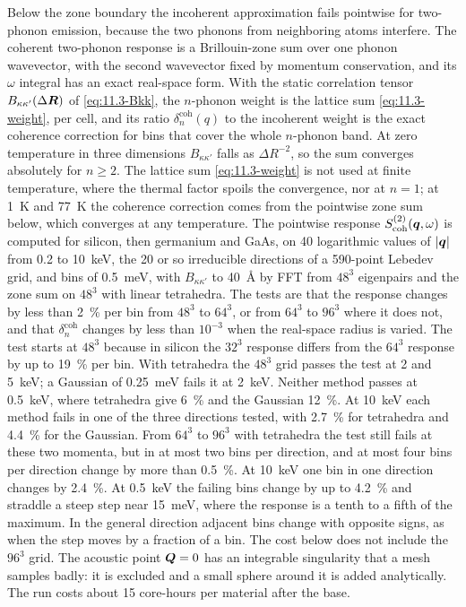 Below the zone boundary the incoherent approximation fails pointwise for two-phonon emission, because the two phonons from neighboring atoms interfere. The coherent two-phonon response is a Brillouin-zone sum over one phonon wavevector, with the second wavevector fixed by momentum conservation, and its $\omega$ integral has an exact real-space form. With the static correlation tensor $B_{\kappa\kappa'}(\Delta\bm{R})$ of \cref{eq:11.3-Bkk}, the $n$-phonon weight is the lattice sum \cref{eq:11.3-weight}, per cell, and its ratio $\delta^{\mathrm{coh}}_n(q)$ to the incoherent weight is the exact coherence correction for bins that cover the whole $n$-phonon band. At zero temperature in three dimensions $B_{\kappa\kappa'}$ falls as $\Delta R^{-2}$, so the sum converges absolutely for $n \ge 2$. The lattice sum \cref{eq:11.3-weight} is not used at finite temperature, where the thermal factor spoils the convergence, nor at $n = 1$; at \SI{1}{K} and \SI{77}{K} the coherence correction comes from the pointwise zone sum below, which converges at any temperature. The pointwise response $S^{(2)}_{\mathrm{coh}}(\bm{q},\omega)$ is computed for silicon, then germanium and GaAs, on 40 logarithmic values of $|\bm{q}|$ from 0.2 to \SI{10}{keV}, the 20 or so irreducible directions of a 590-point Lebedev grid, and bins of \SI{0.5}{meV}, with $B_{\kappa\kappa'}$ to \SI{40}{\angstrom} by FFT from $48^3$ eigenpairs and the zone sum on $48^3$ with linear tetrahedra. The tests are that the response changes by less than \SI{2}{\percent} per bin from $48^3$ to $64^3$, or from $64^3$ to $96^3$ where it does not, and that $\delta^{\mathrm{coh}}_n$ changes by less than $10^{-3}$ when the real-space radius is varied. The test starts at $48^3$ because in silicon the $32^3$ response differs from the $64^3$ response by up to \SI{19}{\percent} per bin. With tetrahedra the $48^3$ grid passes the test at 2 and \SI{5}{keV}; a Gaussian of \SI{0.25}{meV} fails it at \SI{2}{keV}. Neither method passes at \SI{0.5}{keV}, where tetrahedra give \SI{6}{\percent} and the Gaussian \SI{12}{\percent}. At \SI{10}{keV} each method fails in one of the three directions tested, with \SI{2.7}{\percent} for tetrahedra and \SI{4.4}{\percent} for the Gaussian. From $64^3$ to $96^3$ with tetrahedra the test still fails at these two momenta, but in at most two bins per direction, and at most four bins per direction change by more than \SI{0.5}{\percent}. At \SI{10}{keV} one bin in one direction changes by \SI{2.4}{\percent}. At \SI{0.5}{keV} the failing bins change by up to \SI{4.2}{\percent} and straddle a steep step near \SI{15}{meV}, where the response is a tenth to a fifth of the maximum. In the general direction adjacent bins change with opposite signs, as when the step moves by a fraction of a bin. The cost below does not include the $96^3$ grid. The acoustic point $\bm{Q} = 0$ has an integrable singularity that a mesh samples badly: it is excluded and a small sphere around it is added analytically. The run costs about 15 core-hours per material after the base.

